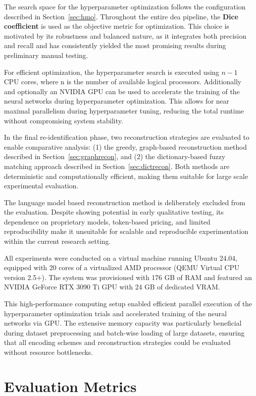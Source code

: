 The search space for the hyperparameter optimization follows the configuration described in Section~\ref{sec:hmo}.
Throughout the entire \ac{dea} pipeline, the \textbf{Dice coefficient} is used as the objective metric for optimization.
This choice is motivated by its robustness and balanced nature, as it integrates both precision and recall and has consistently yielded the most promising results during preliminary manual testing.

For efficient optimization, the hyperparameter search is executed using $n - 1$ CPU cores, where n is the number of available logical processors.
Additionally and optionally an NVIDIA GPU can be used to accelerate the training of the neural networks during hyperparameter optimization.
This allows for near maximal parallelism during hyperparameter tuning, reducing the total runtime without compromising system stability.

In the final re-identification phase, two reconstruction strategies are evaluated to enable comparative analysis: (1) the greedy, graph-based reconstruction method described in Section~\ref{sec:graphrecon}, and (2) the dictionary-based fuzzy matching approach described in Section~\ref{sec:dictrecon}.
Both methods are deterministic and computationally efficient, making them suitable for large scale experimental evaluation.

The language model based reconstruction method is deliberately excluded from the evaluation.
Despite showing potential in early qualitative testing, its dependence on proprietary models, token-based pricing, and limited reproducibility make it unsuitable for scalable and reproducible experimentation within the current research setting.

All experiments were conducted on a virtual machine running Ubuntu 24.04, equipped with 20 cores of a virtualized AMD processor (QEMU Virtual CPU version 2.5+).
The system was provisioned with 176 GB of RAM and featured an NVIDIA GeForce RTX 3090 Ti GPU with 24 GB of dedicated VRAM.

This high-performance computing setup enabled efficient parallel execution of the hyperparameter optimization trials and accelerated training of the neural networks via GPU.
The extensive memory capacity was particularly beneficial during dataset preprocessing and batch-wise loading of large datasets, ensuring that all encoding schemes and reconstruction strategies could be evaluated without resource bottlenecks.

\section{Evaluation Metrics}  \label{sec:metrics}

